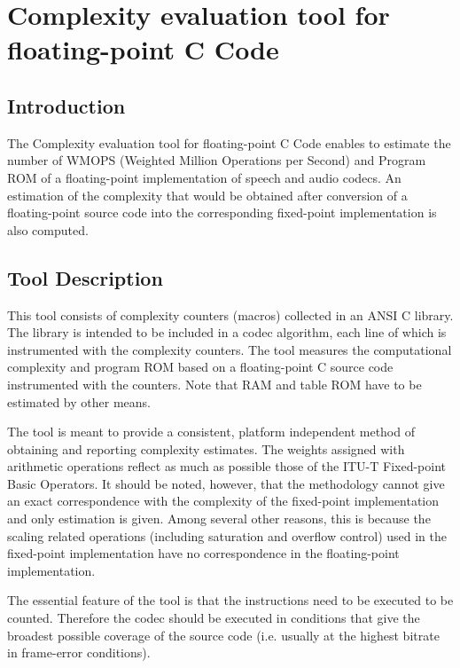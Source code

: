 \section{Complexity evaluation tool for floating-point C Code}

\subsection{Introduction}
The Complexity evaluation tool for floating-point C Code enables to
estimate the number of WMOPS (Weighted Million Operations per Second)
and Program ROM of a floating-point implementation of speech and audio
codecs. An estimation of the complexity that would be obtained
after conversion of a floating-point source code into the corresponding
fixed-point implementation is also computed.

\subsection{Tool Description }
This tool consists of complexity counters (macros) collected in an ANSI
C library. The library is intended to be included in a codec algorithm,
each line of which is instrumented with the complexity counters. The
tool measures the computational complexity and program ROM based on a
floating-point C source code instrumented with the counters. Note that
RAM and table ROM have to be estimated by other means.

The tool is meant to provide a consistent, platform independent method
of obtaining and reporting complexity estimates. The weights assigned
with arithmetic operations reflect as much as possible those of the
ITU-T Fixed-point Basic Operators. It should be noted, however, that the methodology
cannot give an exact correspondence with the complexity of the fixed-point implementation and only estimation is given. Among several other
reasons, this is because the scaling related operations (including
saturation and overflow control) used in the fixed-point implementation
have no correspondence in the floating-point implementation.

The essential feature of the tool is that the instructions need to be
executed to be counted. Therefore the codec should be executed in
conditions that give the broadest possible coverage of the source code
(i.e. usually at the highest bitrate in frame-error conditions).

